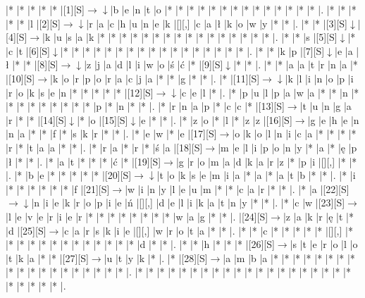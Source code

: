 \documentclass[11pt]{article}
\newcommand\drarr{$\rightarrow \!\!\!\!\! \downarrow$}
\newcommand\rarr{$\rightarrow$}
\newcommand\darr{$\downarrow$}
\begin{document}
\noindent\begin{Puzzle}{24}{21}|*	|*	|*	|*	|*	|[1][S]\drarr	|b	|e	|n	|t	|o	|*	|*	|*	|*	|*	|*	|*	|*	|*	|*	|*	|*	|*	|*	|.
|*	|*	|*	|*	|*	|l	|[2][S]\drarr	|r	|a	|c	|h	|u	|n	|e	|k	|[][,]{ }	|c	|a	|ł	|k	|o	|w	|y	|*	|*	|.
|*	|*	|[3][S]\darr	|[4][S]\rarr	|k	|u	|s	|a	|k	|*	|*	|*	|*	|*	|*	|*	|*	|*	|*	|*	|*	|*	|*	|*	|*	|.
|*	|*	|s	|[5][S]\darr	|*	|c	|t	|[6][S]\darr	|*	|*	|*	|*	|*	|*	|*	|*	|*	|*	|*	|*	|*	|*	|*	|*	|*	|.
|*	|*	|k	|p	|[7][S]\darr	|e	|a	|ł	|*	|*	|[8][S]\drarr	|z	|j	|a	|d	|l	|i	|w	|o	|ś	|ć	|*	|[9][S]\darr	|*	|*	|.
|*	|*	|a	|a	|t	|r	|n	|a	|*	|[10][S]\rarr	|k	|o	|r	|p	|o	|r	|a	|c	|j	|a	|*	|*	|g	|*	|*	|.
|*	|[11][S]\drarr	|k	|l	|i	|n	|o	|p	|i	|r	|o	|k	|s	|e	|n	|*	|*	|*	|*	|*	|[12][S]\drarr	|c	|e	|l	|*	|.
|*	|p	|u	|l	|p	|a	|w	|a	|*	|*	|n	|*	|*	|*	|*	|*	|*	|*	|*	|*	|p	|*	|n	|*	|*	|.
|*	|r	|n	|a	|p	|*	|c	|c	|*	|[13][S]\rarr	|t	|u	|n	|g	|a	|r	|*	|*	|[14][S]\darr	|*	|o	|[15][S]\darr	|e	|*	|*	|.
|*	|z	|o	|*	|l	|*	|z	|z	|[16][S]\rarr	|g	|e	|h	|e	|n	|n	|a	|*	|*	|f	|*	|s	|k	|r	|*	|*	|.
|*	|e	|w	|*	|e	|[17][S]\rarr	|o	|k	|o	|l	|n	|i	|c	|a	|*	|*	|*	|*	|r	|*	|t	|a	|a	|*	|*	|.
|*	|r	|a	|*	|r	|*	|ś	|a	|[18][S]\rarr	|m	|e	|l	|i	|p	|o	|n	|y	|*	|a	|*	|ę	|p	|ł	|*	|*	|.
|*	|a	|t	|*	|*	|*	|ć	|*	|[19][S]\rarr	|g	|r	|o	|m	|a	|d	|k	|a	|r	|z	|*	|p	|i	|[][,]{ }	|*	|*	|.
|*	|b	|e	|*	|*	|*	|*	|*	|[20][S]\drarr	|t	|o	|k	|s	|e	|m	|i	|a	|*	|a	|*	|a	|t	|b	|*	|*	|.
|*	|i	|*	|*	|*	|*	|*	|*	|f	|[21][S]\rarr	|w	|i	|n	|y	|l	|e	|u	|m	|*	|*	|c	|a	|r	|*	|*	|.
|*	|a	|[22][S]\drarr	|n	|i	|e	|k	|r	|o	|p	|i	|e	|ń	|[][,]{ }	|d	|e	|l	|i	|k	|a	|t	|n	|y	|*	|*	|.
|*	|c	|w	|[23][S]\rarr	|l	|e	|v	|e	|r	|i	|e	|r	|*	|*	|*	|*	|*	|*	|*	|*	|w	|a	|g	|*	|*	|.
|[24][S]\rarr	|z	|a	|k	|r	|ę	|t	|*	|d	|[25][S]\rarr	|c	|a	|r	|s	|k	|i	|e	|[][,]{ }	|w	|r	|o	|t	|a	|*	|*	|.
|*	|*	|c	|*	|*	|*	|*	|*	|[][,]{ }	|*	|*	|*	|*	|*	|*	|*	|*	|*	|*	|*	|*	|*	|d	|*	|*	|.
|*	|*	|h	|*	|*	|*	|[26][S]\rarr	|s	|t	|e	|r	|o	|l	|o	|t	|k	|a	|*	|*	|[27][S]\rarr	|u	|t	|y	|k	|*	|.
|*	|[28][S]\rarr	|a	|m	|b	|a	|*	|*	|*	|*	|*	|*	|*	|*	|*	|*	|*	|*	|*	|*	|*	|*	|*	|*	|*	|.
|*	|*	|*	|*	|*	|*	|*	|*	|*	|*	|*	|*	|*	|*	|*	|*	|*	|*	|*	|*	|*	|*	|*	|*	|*	|.\end{Puzzle}

\newpage
\end{document}
